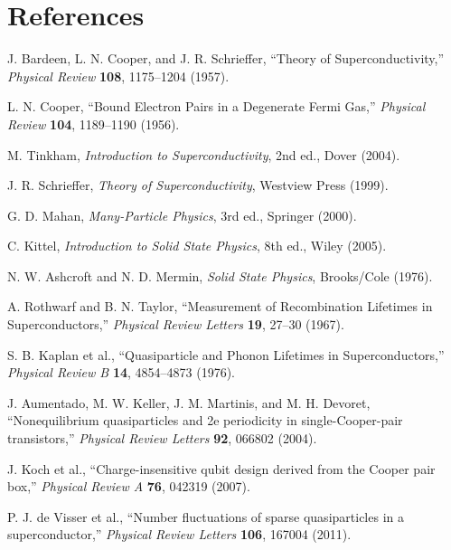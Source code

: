 \documentclass[11pt]{article}
\begin{document}
\section{References}
\begin{enumerate}[label={[\arabic*]}]
\item J. Bardeen, L. N. Cooper, and J. R. Schrieffer, ``Theory of Superconductivity,'' \emph{Physical Review} \textbf{108}, 1175--1204 (1957).
\item L. N. Cooper, ``Bound Electron Pairs in a Degenerate Fermi Gas,'' \emph{Physical Review} \textbf{104}, 1189--1190 (1956).
\item M. Tinkham, \emph{Introduction to Superconductivity}, 2nd ed., Dover (2004).
\item J. R. Schrieffer, \emph{Theory of Superconductivity}, Westview Press (1999).
\item G. D. Mahan, \emph{Many-Particle Physics}, 3rd ed., Springer (2000).
\item C. Kittel, \emph{Introduction to Solid State Physics}, 8th ed., Wiley (2005).
\item N. W. Ashcroft and N. D. Mermin, \emph{Solid State Physics}, Brooks/Cole (1976).
\item A. Rothwarf and B. N. Taylor, ``Measurement of Recombination Lifetimes in Superconductors,'' \emph{Physical Review Letters} \textbf{19}, 27--30 (1967).
\item S. B. Kaplan et al., ``Quasiparticle and Phonon Lifetimes in Superconductors,'' \emph{Physical Review B} \textbf{14}, 4854--4873 (1976).
\item J. Aumentado, M. W. Keller, J. M. Martinis, and M. H. Devoret, ``Nonequilibrium quasiparticles and 2e periodicity in single-Cooper-pair transistors,'' \emph{Physical Review Letters} \textbf{92}, 066802 (2004).
\item J. Koch et al., ``Charge-insensitive qubit design derived from the Cooper pair box,'' \emph{Physical Review A} \textbf{76}, 042319 (2007).
\item P. J. de Visser et al., ``Number fluctuations of sparse quasiparticles in a superconductor,'' \emph{Physical Review Letters} \textbf{106}, 167004 (2011).
\end{enumerate}
\end{document}
